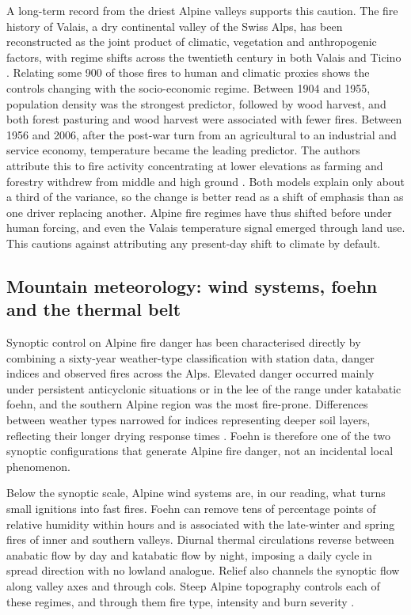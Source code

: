 \documentclass[11pt,a4paper]{article}
\begin{document}
A long-term record from the driest Alpine valleys supports this caution. The fire history of Valais, a dry continental valley of the Swiss Alps, has been reconstructed as the joint product of climatic, vegetation and anthropogenic factors, with regime shifts across the twentieth century in both Valais and Ticino \citep{zumbrunnen_reconstructing_2010}. Relating some 900 of those fires to human and climatic proxies shows the controls changing with the socio-economic regime. Between 1904 and 1955, population density was the strongest predictor, followed by wood harvest, and both forest pasturing and wood harvest were associated with fewer fires. Between 1956 and 2006, after the post-war turn from an agricultural to an industrial and service economy, temperature became the leading predictor. The authors attribute this to fire activity concentrating at lower elevations as farming and forestry withdrew from middle and high ground \citep{zumbrunnen_human_2012}. Both models explain only about a third of the variance, so the change is better read as a shift of emphasis than as one driver replacing another. Alpine fire regimes have thus shifted before under human forcing, and even the Valais temperature signal emerged through land use. This cautions against attributing any present-day shift to climate by default.

\subsection{Mountain meteorology: wind systems, foehn and the thermal belt}

Synoptic control on Alpine fire danger has been characterised directly by combining a sixty-year weather-type classification with station data, danger indices and observed fires across the Alps. Elevated danger occurred mainly under persistent anticyclonic situations or in the lee of the range under katabatic foehn, and the southern Alpine region was the most fire-prone. Differences between weather types narrowed for indices representing deeper soil layers, reflecting their longer drying response times \citep{wastl_largescale_2013}. Foehn is therefore one of the two synoptic configurations that generate Alpine fire danger, not an incidental local phenomenon.

Below the synoptic scale, Alpine wind systems are, in our reading, what turns small ignitions into fast fires. Foehn can remove tens of percentage points of relative humidity within hours and is associated with the late-winter and spring fires of inner and southern valleys. Diurnal thermal circulations reverse between anabatic flow by day and katabatic flow by night, imposing a daily cycle in spread direction with no lowland analogue. Relief also channels the synoptic flow along valley axes and through cols. Steep Alpine topography controls each of these regimes, and through them fire type, intensity and burn severity \citep{melzner_wildfire-induced_2025}.
\end{document}
